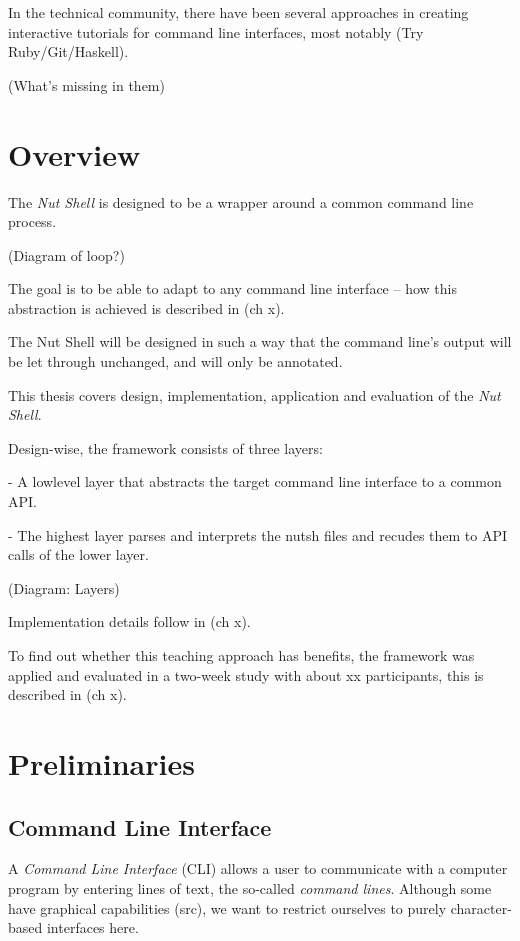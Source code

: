 \documentclass[twoside]{scrreprt}
\begin{document}
In the technical community, there have been several approaches in creating interactive tutorials for command line interfaces, most notably (Try Ruby/Git/Haskell).

(What's missing in them)

\chapter{Overview}

The \emph{Nut Shell} is designed to be a wrapper around a common command line process.

(Diagram of loop?)

The goal is to be able to adapt to any command line interface -- how this abstraction is achieved is described in (ch x).

The Nut Shell will be designed in such a way that the command line's output will be let through unchanged, and will only be annotated.

This thesis covers design, implementation, application and evaluation of the \emph{Nut Shell}.

Design-wise, the framework consists of three layers:

- A lowlevel layer that abstracts the target command line interface to a common API.

- The highest layer parses and interprets the nutsh files and recudes them to API calls of the lower layer.

(Diagram: Layers)

Implementation details follow in (ch x).

To find out whether this teaching approach has benefits, the framework was applied and evaluated in a two-week study with about xx participants, this is described in (ch x).

\chapter{Preliminaries}

\section{Command Line Interface}

A \emph{Command Line Interface} (\textsc{CLI}) allows a user to communicate with a computer program by entering lines of text, the so-called \emph{command lines}. Although some have graphical capabilities (src), we want to restrict ourselves to purely character-based interfaces here.
\end{document}

